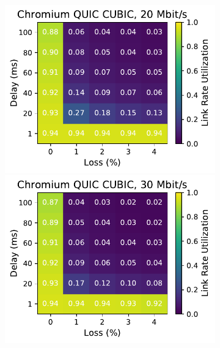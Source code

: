 \begin{figure}[ht]
\begin{subfigure}[b]{0.22\linewidth}
        \includegraphics[width=\linewidth,trim={0 0 2cm 0},clip]{splitting-paper/figures/heatmaps/heatmap_quic_cubic_20mbps.pdf}
        \includegraphics[width=\linewidth,trim={0 0 2cm 0},clip]{splitting-paper/figures/heatmaps/heatmap_quic_cubic_30mbps.pdf}

\end{subfigure}
\end{figure}
